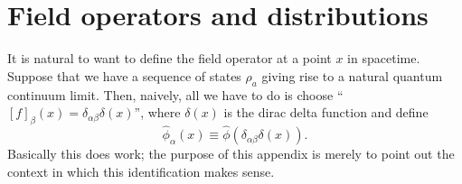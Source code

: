 \documentclass[prl,twocolumn,lengthcheck,superscriptaddress]{revtex4-1}
\theoremstyle{definition}
\theoremstyle{remark}
\begin{document}
\section{Field operators and distributions}
It is natural to want to define the field operator at a point $x$ in spacetime. Suppose that we have a sequence of states $\rho_a$ giving rise to a natural quantum continuum limit. Then, naively, all we have to do is choose ``$[f]_\beta(x) = \delta_{\alpha\beta}\delta(x)$'', where $\delta(x)$ is the dirac delta function and define
\begin{equation}
	\widehat{\phi}_\alpha(x) \equiv \widehat{\phi}(\delta_{\alpha\beta} \delta(x)).
\end{equation}
Basically this does work; the purpose of this appendix is merely to point out the context in which this identification makes sense.
\end{document}
